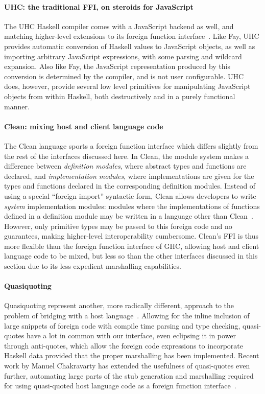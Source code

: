 \documentclass{sigplanconf}
\begin{document}
\paragraph{UHC: the traditional FFI, on steroids for JavaScript}
The UHC Haskell compiler comes with a JavaScript backend as well, and matching
higher-level extensions to its foreign function interface\ \cite{uhc}.
Like Fay, UHC provides automatic conversion of Haskell values to JavaScript
objects, as well as importing arbitrary JavaScript expressions, with some
parsing and wildcard expansion.
Also like Fay, the JavaScript representation produced by this
conversion is determined by the compiler, and is not user configurable.
UHC does, however, provide several low level primitives for manipulating
JavaScript objects from within Haskell, both destructively and in a purely
functional manner.

\paragraph{Clean: mixing host and client language code}
The Clean language sports a foreign function interface which differs slightly
from the rest of the interfaces discussed here. In Clean, the module system
makes a difference between \emph{definition modules}, where abstract types and
functions are declared, and \emph{implementation modules}, where implementations
are given for the types and functions declared in the corresponding definition
modules.
Instead of using a special ``foreign import'' syntactic form, Clean allows
developers to write \emph{system} implementation modules: modules where the
implementations of functions defined in a definition module may be written in
a language other than Clean\ \cite{clean}. However, only primitive types may
be passed to this foreign code and no guarantees, making higher-level
interoperability cumbersome.
Clean's FFI is thus more flexible than the foreign function interface of GHC,
allowing host and client language code to be mixed, but less so than the other
interfaces discussed in this section due to its less expedient marshalling
capabilities.

\paragraph{Quasiquoting}
Quasiquoting represent another, more radically different, approach to the
problem of bridging with a host language\ \cite{quasiquotes}.
Allowing for the inline inclusion of large snippets of foreign code with
compile time parsing and type checking,
quasi-quotes have a lot in common with our interface, even eclipsing it in
power through anti-quotes, which allow the foreign code expressions to
incorporate Haskell data provided that the proper marshalling has been
implemented. Recent work by Manuel Chakravarty has extended the usefulness of
quasi-quotes even further, automating large parts of the stub generation
and marshalling required for using quasi-quoted host language code as a
foreign function interface\ \cite{language-c-inline}.
\end{document}
